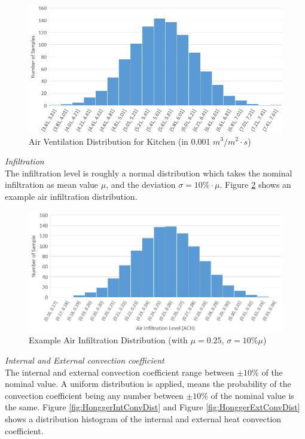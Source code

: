 \documentclass[a4paper, oneside]{discothesis}
\begin{document}
			\begin{figure}[ht!]
			\centering
			\includegraphics[scale=0.65]{Kitchen_Vent.jpg}
			\caption{Air Ventilation Distribution for Kitchen (in 0.001 $m^3/m^2 \cdot s$)}
			\label{fig:VentDist}
			\end{figure}
						
		\textit{Infiltration}\\
			The infiltration level is roughly a normal distribution which takes the nominal infiltration as mean value $\mu$, and the deviation $\sigma = 10\% \cdot \mu$. Figure \ref{fig:EXPAirInfiltration_Sumatra} shows an example air infiltration distribution.\\

			\begin{figure}[ht!]
			\centering
			\includegraphics[scale=0.65]{Example_Normal_Distribution.jpg}
			\caption{Example Air Infiltration Distribution (with $\mu = 0.25$, $\sigma = 10\% \mu$)}
			\label{fig:EXPAirInfiltration_Sumatra}
			\end{figure}
		
		\textit{Internal and External convection coefficient}\\
			The internal and external convection coefficient range between $\pm 10\%$ of the nominal value.
			A uniform distribution is applied, means the probability of the convection coefficient being any number between $\pm 10\%$ of the nominal value is the same. Figure \ref{fig:HonggerIntConvDist} and Figure \ref{fig:HonggerExtConvDist} shows a distribution histogram of the internal and external heat convection coefficient.\\
\end{document}
